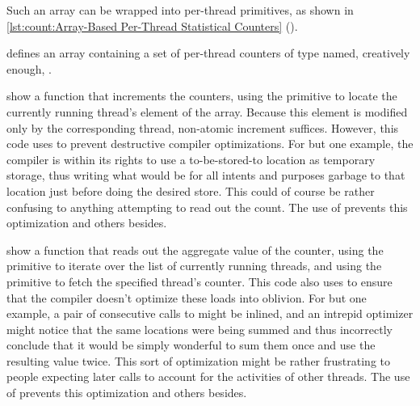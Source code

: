 \begin{listing}

\caption{Array-Based Per-Thread Statistical Counters}
\label{lst:count:Array-Based Per-Thread Statistical Counters}
\end{listing}

Such an array can be wrapped into per-thread primitives, as shown in
\cref{lst:count:Array-Based Per-Thread Statistical Counters}
().
\begin{fcvref}
 defines an array containing a set of per-thread counters of
type  named, creatively enough, .

show a function that increments the counters, using the
 primitive to locate the currently running
thread's element of the  array.
Because this element is modified only by the corresponding thread,
non-atomic increment suffices.
However, this code uses  to prevent destructive compiler
optimizations.
For but one example, the compiler is within its rights to use a
to-be-stored-to location as temporary storage, thus writing what
would be for all intents and purposes garbage to that location
just before doing the desired store.
This could of course be rather confusing to anything attempting to
read out the count.
The use of  prevents this optimization and others besides.

\QuickQuizEnd

show a function that reads out the aggregate value of the counter,
using the  primitive to iterate over the list of
currently running threads, and using the  primitive
to fetch the specified thread's counter.
This code also uses  to ensure that the compiler doesn't
optimize these loads into oblivion.
For but one example, a pair of consecutive calls to 
might be inlined, and an intrepid optimizer might notice that the same
locations were being summed and thus incorrectly conclude that it would
be simply wonderful to sum them once and use the resulting value twice.
This sort of optimization might be rather frustrating to people expecting
later  calls to account for the activities of other
threads.
The use of  prevents this optimization and others besides.
\end{fcvref}

